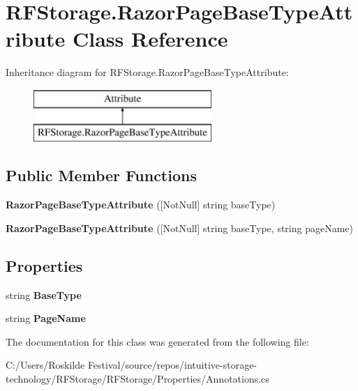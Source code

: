 \section{R\+F\+Storage.\+Razor\+Page\+Base\+Type\+Attribute Class Reference}
\label{class_r_f_storage_1_1_razor_page_base_type_attribute}
Inheritance diagram for R\+F\+Storage.\+Razor\+Page\+Base\+Type\+Attribute\+:\begin{figure}[H]
\begin{center}
\leavevmode
\includegraphics[height=2.000000cm]{class_r_f_storage_1_1_razor_page_base_type_attribute}
\end{center}
\end{figure}
\subsection*{Public Member Functions}
\begin{DoxyCompactItemize}
\item 
\mbox{\label{class_r_f_storage_1_1_razor_page_base_type_attribute_a4608fbff6aae9fab5ab74d945ca509f8}} 
{\bfseries Razor\+Page\+Base\+Type\+Attribute} ([Not\+Null] string base\+Type)
\item 
\mbox{\label{class_r_f_storage_1_1_razor_page_base_type_attribute_a80e5efec9aeba16468d6c11e63e53a3d}} 
{\bfseries Razor\+Page\+Base\+Type\+Attribute} ([Not\+Null] string base\+Type, string page\+Name)
\end{DoxyCompactItemize}
\subsection*{Properties}
\begin{DoxyCompactItemize}
\item 
\mbox{\label{class_r_f_storage_1_1_razor_page_base_type_attribute_ae130b555450df41c4ce772053bf135a6}} 
string {\bfseries Base\+Type}\hspace{0.3cm}{\ttfamily  [get]}
\item 
\mbox{\label{class_r_f_storage_1_1_razor_page_base_type_attribute_a18185441cfd8f33adec138b2958a84bc}} 
string {\bfseries Page\+Name}\hspace{0.3cm}{\ttfamily  [get]}
\end{DoxyCompactItemize}


The documentation for this class was generated from the following file\+:\begin{DoxyCompactItemize}
\item 
C\+:/\+Users/\+Roskilde Festival/source/repos/intuitive-\/storage-\/technology/\+R\+F\+Storage/\+R\+F\+Storage/\+Properties/Annotations.\+cs\end{DoxyCompactItemize}

